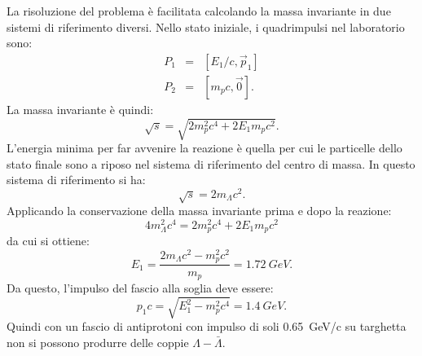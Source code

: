 \begin{Answer}
  La risoluzione del problema \`e facilitata calcolando la massa invariante in due sistemi
  di riferimento diversi. Nello stato iniziale, i quadrimpulsi nel laboratorio sono:
  \begin{eqnarray*}
    P_1 &=& [E_1/c, \vec p_1] \\
    P_2 &=& [m_pc,\vec 0].
  \end{eqnarray*}
  La massa invariante \`e quindi:
  \begin{equation*}
    \sqrt{s} = \sqrt{2m_p^2c^4+2E_1m_pc^2}.
  \end{equation*}
  L'energia minima per far avvenire la reazione \`e quella per cui le
  particelle dello stato finale sono a riposo nel sistema di
  riferimento del centro di massa. In questo sistema di riferimento si ha:
  \begin{equation*}
    \sqrt{s} = 2m_\Lambda c^2.
  \end{equation*}
  Applicando la conservazione della massa invariante prima e dopo la reazione:
  \begin{equation*}
    4m_\Lambda^2c^4 = 2 m_p^2c^4 + 2 E_1m_pc^2
  \end{equation*}
  da cui si ottiene:
  \begin{equation*}
    E_1 = \frac{2m_\Lambda c^2-m_p^2c^2}{m_p} = \SI{1.72}{GeV}.
  \end{equation*}
  Da questo, l'impulso del fascio alla soglia deve essere:
  \begin{equation*}
    p_1c = \sqrt{E_1^2 - m_p^2 c^4} = \SI{1.4}{GeV}.
  \end{equation*}
  Quindi con un fascio di antiprotoni con impulso di soli
  \SI{0.65}{GeV/c} su targhetta non si possono produrre delle coppie
  $\Lambda-\bar\Lambda$.
  
\end{Answer}

